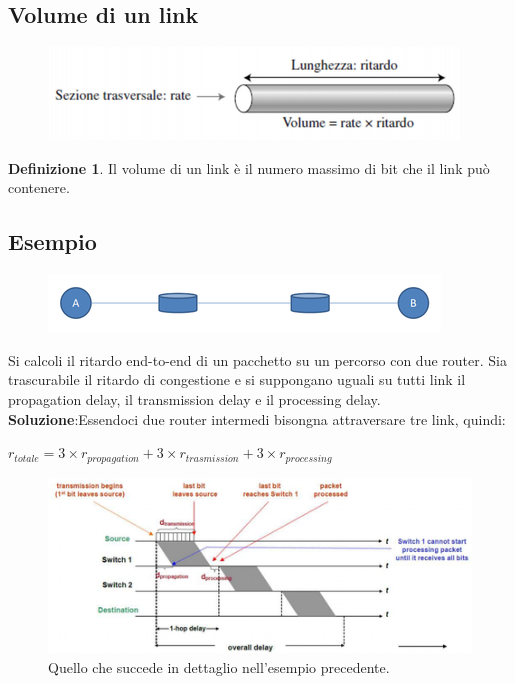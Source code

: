 \documentclass[11pt,a4paper]{article}
\theoremstyle{definition}
\newtheorem{definition}{Definizione}[section]
\begin{document}
\subsection{Volume di un link}
\begin{figure}[!h]
	\includegraphics[scale=0.5]{Immagini/Link_Volume.png}
	\centering
\end{figure}
\theoremstyle{definition}
\begin{definition}
	Il volume di un link è il numero massimo di bit che il link può contenere.
\end{definition}
\centerline{}

\subsection{Esempio}
\begin{figure}[!h]
	\includegraphics[scale=0.5]{Immagini/Esempio_ritardi.png}
	\centering
\end{figure}
Si calcoli il ritardo end-to-end di un pacchetto su un percorso con due router. Sia trascurabile il ritardo di congestione e si suppongano uguali su tutti link il propagation delay, il transmission delay e il processing delay.\newline\newline
\textbf{Soluzione}:\newline Essendoci due router intermedi bisongna attraversare tre link, quindi:\newline
\centerline{$r_{totale} = 3\times r_{propagation} + 3\times r_{trasmission} + 3\times r_{processing}$}
\newpage
\begin{figure}[!h]
	\includegraphics[scale=0.5]{Immagini/Soluzione_ritardi.png}
	\centering
	\caption{Quello che succede in dettaglio nell'esempio precedente.}
\end{figure}
\end{document}
